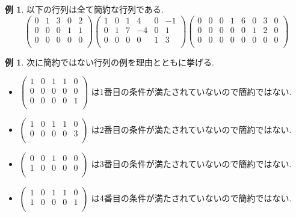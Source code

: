 \documentclass[dvipdfmx,a4paper,11pt]{article}
\theoremstyle{definition}
\newtheorem{exa}[thm]{例}
\begin{document}
 
 \begin{exa}
以下の行列は全て簡約な行列である.
$$
 \begin{pmatrix}
 0& 1& 3  & 0&2\\
 0& 0& 0  & 1&1\\
 0& 0& 0 & 0&0\\
 \end{pmatrix}
  \begin{pmatrix}
 1& 0& 1  & 4&0&-1\\
 0& 1& 7 & -4&0&1\\
 0& 0& 0 & 0&1&3\\
 \end{pmatrix}
   \begin{pmatrix}
 0& 0& 0  & 1&6&0&3&0\\
 0& 0& 0 & 0&0&1&2&0\\
 0& 0& 0 & 0&0&0&0&0 \\
 \end{pmatrix}
$$
\end{exa}
 \begin{exa}
 次に簡約ではない行列の例を理由とともに挙げる.
 \begin{itemize}
\item 
$ 
\begin{pmatrix}
 1& 0& 1  & 1&0\\
 0& 0& 0  & 0&0\\
 0& 0& 0 & 0&1\\
 \end{pmatrix} 
 $
 は1番目の条件が満たされていないので簡約ではない.
 \item 
$ 
\begin{pmatrix}
 1& 0& 1  & 1&0\\
 0& 0& 0  & 0&3\\
 \end{pmatrix} 
 $
 は2番目の条件が満たされていないので簡約ではない.
 \item 
$ 
\begin{pmatrix}
 0& 0& 1  & 0&0\\
 1& 0& 0  & 0&0\\
 \end{pmatrix} 
 $
 は3番目の条件が満たされていないので簡約ではない.
 \item 
$ 
\begin{pmatrix}
 1& 0& 1  & 1&0\\
 1& 0& 0  & 0&1\\
 \end{pmatrix} 
 $
 は4番目の条件が満たされていないので簡約ではない.
 \end{itemize}
\end{exa}
\end{document}
